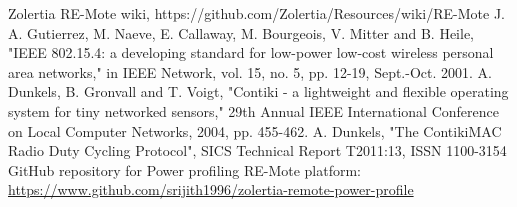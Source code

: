 \documentclass[a4paper]{article}
\begin{document}
\begin{thebibliography}{9}
  Zolertia RE-Mote wiki, https://github.com/Zolertia/Resources/wiki/RE-Mote
  J. A. Gutierrez, M. Naeve, E. Callaway, M. Bourgeois, V. Mitter and B. Heile, "IEEE 802.15.4: a developing standard for low-power low-cost wireless personal area networks," in IEEE Network, vol. 15, no. 5, pp. 12-19, Sept.-Oct. 2001.
  A. Dunkels, B. Gronvall and T. Voigt, "Contiki - a lightweight and flexible operating system for tiny networked sensors," 29th Annual IEEE International Conference on Local Computer Networks, 2004, pp. 455-462.
  A. Dunkels, "The ContikiMAC Radio Duty Cycling Protocol", SICS Technical Report T2011:13, ISSN 1100-3154
  GitHub repository for Power profiling RE-Mote platform: \url{https://www.github.com/srijith1996/zolertia-remote-power-profile}

\end{thebibliography}
\end{document}
